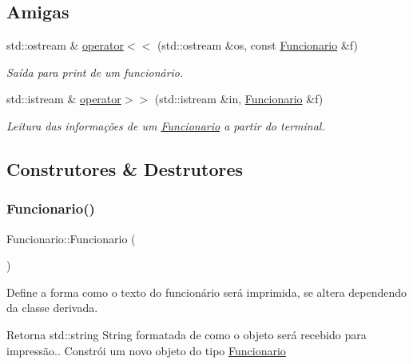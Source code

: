 \subsection*{Amigas}
\begin{DoxyCompactItemize}
\item 
std\+::ostream \& \hyperlink{classFuncionario_ab7a9c1544d954fd29f3c821781334a54}{operator$<$$<$} (std\+::ostream \&os, const \hyperlink{classFuncionario}{Funcionario} \&f)
\begin{DoxyCompactList}\small\item\em Saída para print de um funcionário. \end{DoxyCompactList}\item 
std\+::istream \& \hyperlink{classFuncionario_ab45a99ce14b2d5eb5b0b147b6ed39382}{operator$>$$>$} (std\+::istream \&in, \hyperlink{classFuncionario}{Funcionario} \&f)
\begin{DoxyCompactList}\small\item\em Leitura das informações de um \hyperlink{classFuncionario}{Funcionario} a partir do terminal. \end{DoxyCompactList}\end{DoxyCompactItemize}


\subsection{Construtores \& Destrutores}
\mbox{\label{classFuncionario_a7cd39b2c6cd2449162481a8c0e7a2429}} 
\subsubsection{\texorpdfstring{Funcionario()}{Funcionario()}\hspace{0.1cm}{\footnotesize\ttfamily [1/3]}}
{\footnotesize\ttfamily Funcionario\+::\+Funcionario (\begin{DoxyParamCaption}{ }\end{DoxyParamCaption})\hspace{0.3cm}{\ttfamily [inline]}}



Define a forma como o texto do funcionário será imprimida, se altera dependendo da classe derivada. 

\begin{DoxyReturn}{Retorna}
std\+::string String formatada de como o objeto será recebido para impressão.. Constrói um novo objeto do tipo \hyperlink{classFuncionario}{Funcionario} 
\end{DoxyReturn}
\mbox{\label{classFuncionario_acc3a59366c68a3a56a4d4114931a11c9}} 
